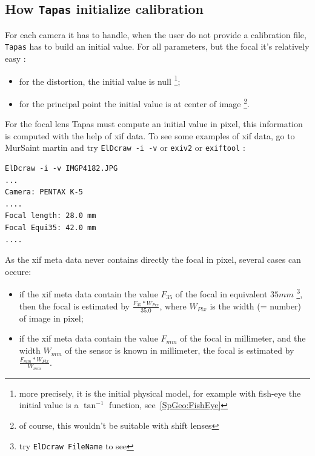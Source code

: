 \subsection{How {\tt Tapas} initialize calibration}

For each camera it has to handle, when the user do not provide a calibration
file, {\tt Tapas} has to build an initial  value. For all parameters, but the
focal it's relatively easy :

\begin{itemize}
  \item for the distortion, the initial value is null \footnote{more
        precisely, it is the initial physical model, for example
        with fish-eye the initial value is a $\tan^{-1} $ function, see~\ref{SpGeo:FishEye}};

  \item for the principal point the initial value is at center of image
        \footnote{ of course, this wouldn't be suitable with shift lenses}.
\end{itemize}

For the focal lens Tapas must compute an initial value in pixel, this information is
computed with the help of xif data. To see some examples of xif data, go to MurSaint martin
and try {\tt ElDcraw -i -v} or {\tt exiv2} or {\tt exiftool} :

\begin{verbatim}
ElDcraw -i -v IMGP4182.JPG
...
Camera: PENTAX K-5
....
Focal length: 28.0 mm
Focal Equi35: 42.0 mm
....
\end{verbatim}

As the xif meta data never contains directly the focal in pixel,
several cases can  occure:

\begin{itemize}
  \item if the xif meta data contain the value $F_{35}$ of the focal in equivalent $35mm$
       \footnote{try {\tt ElDcraw FileName} to see}, then the focal is estimated by
       $\frac{F_{35} * W_{Pix}}{35.0}$, where $W_{Pix}$ is the width (= number)
       of image in pixel;

  \item if the xif meta data contain the value $F_{mm}$ of the focal in millimeter,
        and the width  $W_{mm}$  of the sensor is known in millimeter, the focal is estimated
        by $\frac{F_{mm} * W_{Pix}}{W_{mm}}$.

\end{itemize}

